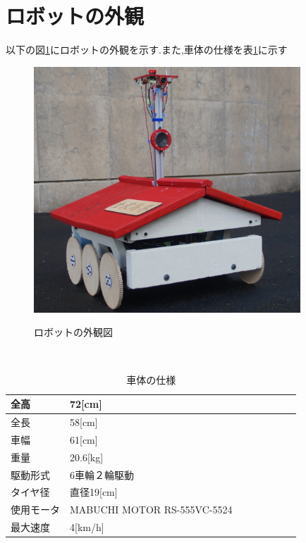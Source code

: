 \documentclass[12pt,oneside]{sotsuken_paper}
\begin{document}
\section{ロボットの外観}
以下の図\ref{fig:gaikan}にロボットの外観を示す.また,車体の仕様を表\ref{tab:siyou}に示す

\begin{figure}[htp]
 \begin{center}
  \includegraphics[width=100mm]{img/hard/gaikan.jpg}
 　\caption{ロボットの外観図}
  \label{fig:gaikan}%
 \end{center}
\end{figure}

\begin{table}[htp]
 　\begin{center}
    \caption{車体の仕様}
  \begin{tabular}{|l|l|l|l|l|l|l|l|} \hline
全高 & 72[cm] \\  \hline
全長 & 58[cm] \\ \hline
車幅 & 61[cm] \\ \hline
重量 & 20.6[kg] \\ \hline
駆動形式 & 6車輪２輪駆動 \\ \hline
タイヤ径 & 直径19[cm] \\ \hline
使用モータ &  MABUCHI MOTOR RS-555VC-5524\\ \hline
最大速度 & 4[km/h] \\ \hline
  \end{tabular}
　   \label{tab:siyou}
  \end{center}
\end{table}
\end{document}
